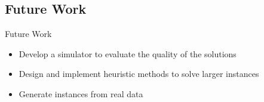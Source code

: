 


\subsection{Future Work}
\begin{frame}{Future Work}
  \begin{itemize}
  \item Develop a simulator to evaluate the quality of the solutions
  \item Design and implement heuristic methods to solve larger instances
  \item Generate instances from real data
  \end{itemize}
\end{frame}
